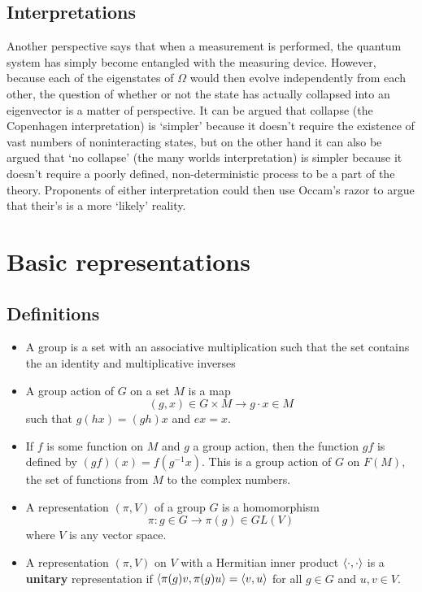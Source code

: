 \documentclass[a4paper]{article}
\begin{document}
\subsection{Interpretations}
Another perspective says that when a measurement is performed, the quantum system has simply become entangled with the measuring device. However, because each of the eigenstates of $\Omega$ would then evolve independently from each other, the question of whether or not the state has actually collapsed into an eigenvector is a matter of perspective. It can be argued that collapse (the Copenhagen interpretation) is `simpler' because it doesn't require the existence of vast numbers of noninteracting states, but on the other hand it can also be argued that `no collapse' (the many worlds interpretation) is simpler because it doesn't require a poorly defined, non-deterministic process to be a part of the theory. Proponents of either interpretation could then use Occam's razor to argue that their's is a more `likely' reality.

\section{Basic representations}
\subsection{Definitions}
\begin{itemize}
    \item A group is a set with an associative multiplication such that the set contains the an identity and multiplicative inverses
    \item A group action of $G$ on a set $M$ is a map $$(g, x) \in G \times M \to g \cdot x \in M$$ such that $g(hx) = (g h)x$ and $ex = x$.
    \item If $f$ is some function on $M$ and $g$ a group action, then the function $g f$ is defined by $(gf)(x)= f(g^{-1}x)$. This is a group action of $G$ on $F(M)$, the set of functions from $M$ to the complex numbers.
    \item A representation $(\pi, V)$ of a group $G$ is a homomorphism $$\pi : g \in G \to \pi(g) \in GL(V)$$ where $V$ is any vector space.
    \item A representation $(\pi, V)$ on $V$ with a Hermitian inner product $\left\langle \cdot , \cdot \right\rangle$ is a \textbf{unitary} representation if $\left\langle \pi(g)v , \pi(g)u \right\rangle = \left\langle v , u \right\rangle$ for all $g \in G$ and $u, v \in V$.
\end{itemize}
\end{document}
